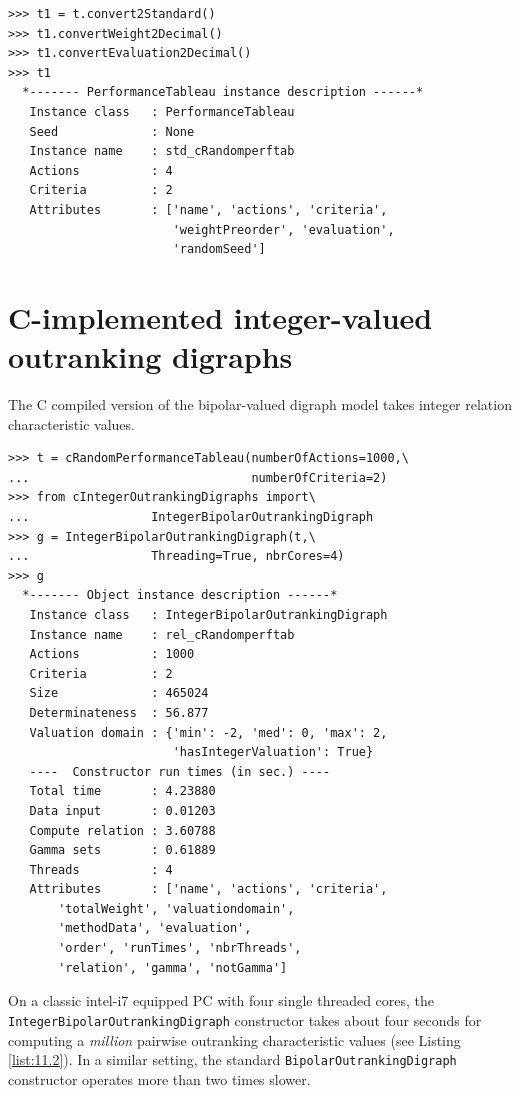 \begin{lstlisting}   
>>> t1 = t.convert2Standard()
>>> t1.convertWeight2Decimal()
>>> t1.convertEvaluation2Decimal()
>>> t1
  *------- PerformanceTableau instance description ------*
   Instance class   : PerformanceTableau
   Seed             : None
   Instance name    : std_cRandomperftab
   Actions          : 4
   Criteria         : 2
   Attributes       : ['name', 'actions', 'criteria',
                       'weightPreorder', 'evaluation',
                       'randomSeed']
\end{lstlisting}

\section{C-implemented integer-valued outranking digraphs}
\label{sec:11.3}


The C compiled version of the bipolar-valued digraph model takes integer relation characteristic values.

\begin{lstlisting}[caption={Constructing big outranking digraphs},label=list:11.2]
>>> t = cRandomPerformanceTableau(numberOfActions=1000,\
...                               numberOfCriteria=2)
>>> from cIntegerOutrankingDigraphs import\
...                 IntegerBipolarOutrankingDigraph
>>> g = IntegerBipolarOutrankingDigraph(t,\
...                 Threading=True, nbrCores=4)
>>> g
  *------- Object instance description ------*
   Instance class   : IntegerBipolarOutrankingDigraph
   Instance name    : rel_cRandomperftab
   Actions          : 1000
   Criteria         : 2
   Size             : 465024
   Determinateness  : 56.877
   Valuation domain : {'min': -2, 'med': 0, 'max': 2,
                       'hasIntegerValuation': True}
   ----  Constructor run times (in sec.) ----
   Total time       : 4.23880
   Data input       : 0.01203
   Compute relation : 3.60788
   Gamma sets       : 0.61889
   Threads          : 4
   Attributes       : ['name', 'actions', 'criteria',
       'totalWeight', 'valuationdomain',
       'methodData', 'evaluation',
       'order', 'runTimes', 'nbrThreads',
       'relation', 'gamma', 'notGamma']
\end{lstlisting}

On a classic intel-i7 equipped PC with four single threaded cores, the\\ \texttt{IntegerBipolarOutrankingDigraph} constructor takes about four seconds for computing a \emph{million} pairwise outranking characteristic values (see Listing \ref{list:11.2}). In a similar setting, the standard \texttt{BipolarOutrankingDigraph} constructor operates more than two times slower.

